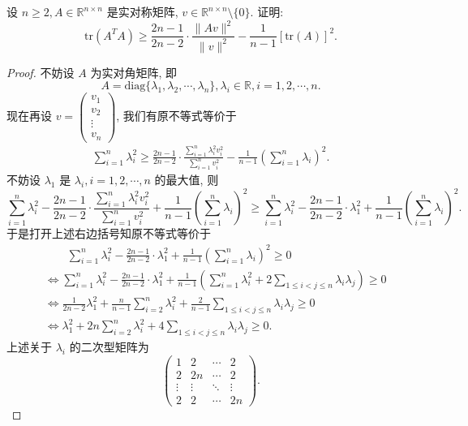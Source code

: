 \documentclass[../../main.tex]{subfiles}
\begin{document}
\begin{example}
设 \( n \geq 2, A \in \mathbb{R}^{n \times n} \) 是实对称矩阵, \( v \in \mathbb{R}^{n \times n} \setminus \{0\} \). 证明:
\[
\text{tr}(A^TA) \geq \frac{2n - 1}{2n - 2} \cdot \frac{\|Av\|^2}{\|v\|^2} - \frac{1}{n - 1}[\text{tr}(A)]^2.
\]
\end{example}
\begin{proof}
不妨设 \( A \) 为实对角矩阵, 即
\[
A = \text{diag}\{\lambda_1, \lambda_2, \cdots, \lambda_n\}, \lambda_i \in \mathbb{R}, i = 1,2,\cdots, n.
\]
现在再设 \( v = \begin{pmatrix} v_1 \\ v_2 \\ \vdots \\ v_n \end{pmatrix} \), 我们有原不等式等价于
\begin{align*}
\sum_{i=1}^n \lambda_i^2 \geq \frac{2n - 1}{2n - 2} \cdot \frac{\sum\limits_{i=1}^n \lambda_i^2 v_i^2}{\sum\limits_{i=1}^n v_i^2} - \frac{1}{n - 1} \left( \sum_{i=1}^n \lambda_i \right)^2. 
\end{align*}
不妨设 \( \lambda_1 \) 是 \( \lambda_i, i = 1,2,\cdots, n \) 的最大值, 则
\[
\sum_{i=1}^n \lambda_i^2 - \frac{2n - 1}{2n - 2} \cdot \frac{\sum\limits_{i=1}^n \lambda_i^2 v_i^2}{\sum\limits_{i=1}^n v_i^2} + \frac{1}{n - 1} \left( \sum\limits_{i=1}^n \lambda_i \right)^2 \geqslant \sum_{i=1}^n \lambda_i^2 - \frac{2n - 1}{2n - 2} \cdot \lambda_1^2 + \frac{1}{n - 1} \left( \sum_{i=1}^n \lambda_i \right)^2.
\]
于是打开上述右边括号知原不等式等价于
\begin{align}
&\quad \quad \sum_{i=1}^n{\lambda _{i}^{2}}-\frac{2n-1}{2n-2}\cdot \lambda _{1}^{2}+\frac{1}{n-1}\left( \sum_{i=1}^n{\lambda _i} \right) ^2\geqslant 0
\nonumber \\
&\Longleftrightarrow \sum_{i=1}^n{\lambda _{i}^{2}}-\frac{2n-1}{2n-2}\cdot \lambda _{1}^{2}+\frac{1}{n-1}\left( \sum_{i=1}^n{\lambda _{i}^{2}}+2\sum_{1\le i<j\le n}{\lambda _i\lambda _j} \right) \geqslant 0
\nonumber \\
&\Longleftrightarrow \frac{1}{2n-2}\lambda _{1}^{2}+\frac{n}{n-1}\sum_{i=2}^n{\lambda _{i}^{2}}+\frac{2}{n-1}\sum_{1\le i<j\le n}{\lambda _i\lambda _j}\geqslant 0
\nonumber \\
&\Longleftrightarrow \lambda _{1}^{2}+2n\sum_{i=2}^n{\lambda _{i}^{2}}+4\sum_{1\le i<j\le n}{\lambda _i\lambda _j}\geqslant 0.\label{eq:::-----1568165435
3615-11}
\end{align}
上述关于 \( \lambda_i \) 的二次型矩阵为
\[
\begin{pmatrix} 1 & 2 & \cdots & 2 \\ 2 & 2n & \cdots & 2 \\ \vdots & \vdots & \ddots & \vdots \\ 2 & 2 & \cdots & 2n \end{pmatrix}.
\]
\end{proof}
\end{document}
